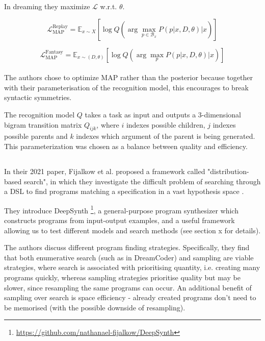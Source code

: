 In dreaming they maximize \(\mathcal{L}\) w.r.t. \(\theta\).

\[
    \mathcal{L}_{\text{MAP}}^{\text{Replay}} = \mathbb{E}_{x\sim X} \left[ \log Q \left( \arg\max_{p \in \mathcal{B}_x} P(p|x, D, \theta)  \Big\lvert x \right) \right]
\]

\[
    \mathcal{L}_{\text{MAP}}^{\text{Fantasy}} = \mathbb{E}_{x \sim (D, \theta)} \left[ \log Q \left( \arg\max_{p} P(p|x, D, \theta) \Big\lvert x \right) \right]  
\]

\paragraph{}
The authors chose to optimize MAP rather than the posterior because together with their parameterisation of the recognition model, this encourages to break syntactic symmetries.

The recognition model \(Q\) takes a task as input and outputs a 3-dimensional bigram transition matrix \(Q_{ijk}\), where \(i\) indexes possible children, \(j\) indexes possible parents and \(k\) indexes which argument of the parent is being generated. This parameterization was chosen as a balance between quality and efficiency.




\subsection{}

In their 2021 paper, Fijalkow et al. proposed a framework called "distribution-based search", in which they investigate the difficult problem of searching through a DSL to find programs matching a specification in a vast hypothesis space \cite{fijalkow_scaling_2021}.

They introduce DeepSynth \footnote{\url{https://github.com/nathanael-fijalkow/DeepSynth}}, a general-purpose program synthesizer which constructs programs from input-output examples, and a useful framework allowing us to test different models and search methods (see section x for details).

The authors discuss different program finding strategies. Specifically, they find that both enumerative search (such as in DreamCoder) and sampling are viable strategies, where search is associated with prioritising quantity, i.e.  creating many programs quickly, whereas sampling strategies prioritise quality but may be slower, since resampling the same programs can occur. An additional benefit of sampling over search is space efficiency - already created programs don't need to be memorised (with the possible downside of resampling).


